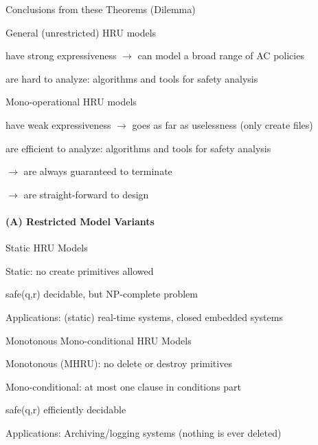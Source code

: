 \documentclass[a4paper]{article}
\begin{document}
\begin{multicols}{3}
    Conclusions from these Theorems (Dilemma)
    \begin{itemize*}
        \item General (unrestricted) HRU models
        \begin{itemize*}
            \item have strong expressiveness $\rightarrow$  can model a broad range of AC policies
            \item are hard to analyze: algorithms and tools for safety analysis
        \end{itemize*}
        \item Mono-operational HRU models
        \begin{itemize*}
            \item have weak expressiveness $\rightarrow$ goes as far as uselessness (only create files)
            \item are efficient to analyze: algorithms and tools for safety analysis
            \item $\rightarrow$ are always guaranteed to terminate
            \item $\rightarrow$ are straight-forward to design
        \end{itemize*}
    \end{itemize*}

    \paragraph{(A) Restricted Model Variants}

    Static HRU Models
    \begin{itemize*}
        \item Static: no create primitives allowed
        \item safe(q,r) decidable, but NP-complete problem
        \item Applications: (static) real-time systems, closed embedded systems
    \end{itemize*}

    Monotonous Mono-conditional HRU Models
    \begin{itemize*}
        \item Monotonous (MHRU): no delete or destroy primitives
        \item Mono-conditional: at most one clause in conditions part
        \item safe(q,r) efficiently decidable
        \item Applications: Archiving/logging systems (nothing is ever deleted)
    \end{itemize*}


\end{multicols}
\end{document}
